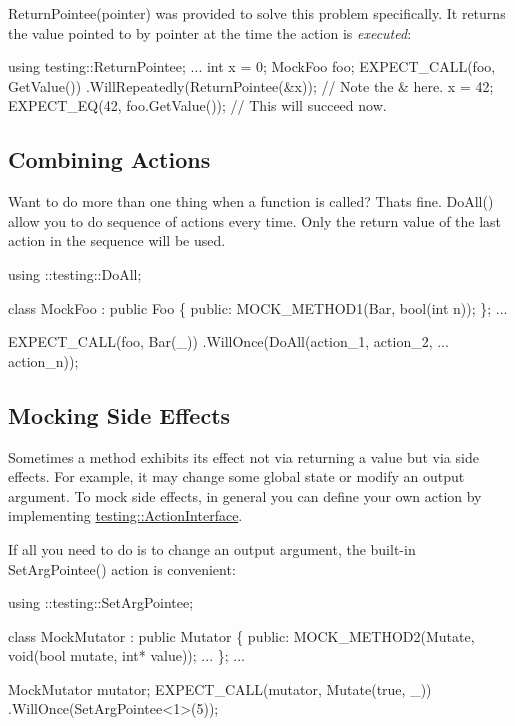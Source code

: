 {\ttfamily Return\+Pointee(pointer)} was provided to solve this problem specifically. It returns the value pointed to by {\ttfamily pointer} at the time the action is {\itshape executed}\+:


\begin{DoxyCode}
\textcolor{keyword}{using} testing::ReturnPointee;
...
  \textcolor{keywordtype}{int} x = 0;
  MockFoo foo;
  EXPECT\_CALL(foo, GetValue())
      .WillRepeatedly(ReturnPointee(&x));  \textcolor{comment}{// Note the & here.}
  x = 42;
  EXPECT\_EQ(42, foo.GetValue());  \textcolor{comment}{// This will succeed now.}
\end{DoxyCode}


\subsection*{Combining Actions}

Want to do more than one thing when a function is called? That\textquotesingle{}s fine. {\ttfamily Do\+All()} allow you to do sequence of actions every time. Only the return value of the last action in the sequence will be used.


\begin{DoxyCode}
using ::testing::DoAll;

\textcolor{keyword}{class }MockFoo : \textcolor{keyword}{public} Foo \{
 \textcolor{keyword}{public}:
  MOCK\_METHOD1(Bar, \textcolor{keywordtype}{bool}(\textcolor{keywordtype}{int} n));
\};
...

  EXPECT\_CALL(foo, Bar(\_))
      .WillOnce(DoAll(action\_1,
                      action\_2,
                      ...
                      action\_n));
\end{DoxyCode}


\subsection*{Mocking Side Effects}

Sometimes a method exhibits its effect not via returning a value but via side effects. For example, it may change some global state or modify an output argument. To mock side effects, in general you can define your own action by implementing {\ttfamily \hyperlink{classtesting_1_1ActionInterface}{testing\+::\+Action\+Interface}}.

If all you need to do is to change an output argument, the built-\/in {\ttfamily Set\+Arg\+Pointee()} action is convenient\+:


\begin{DoxyCode}
using ::testing::SetArgPointee;

\textcolor{keyword}{class }MockMutator : \textcolor{keyword}{public} Mutator \{
 \textcolor{keyword}{public}:
  MOCK\_METHOD2(Mutate, \textcolor{keywordtype}{void}(\textcolor{keywordtype}{bool} mutate, \textcolor{keywordtype}{int}* value));
  ...
\};
...

  MockMutator mutator;
  EXPECT\_CALL(mutator, Mutate(\textcolor{keyword}{true}, \_))
      .WillOnce(SetArgPointee<1>(5));
\end{DoxyCode}


